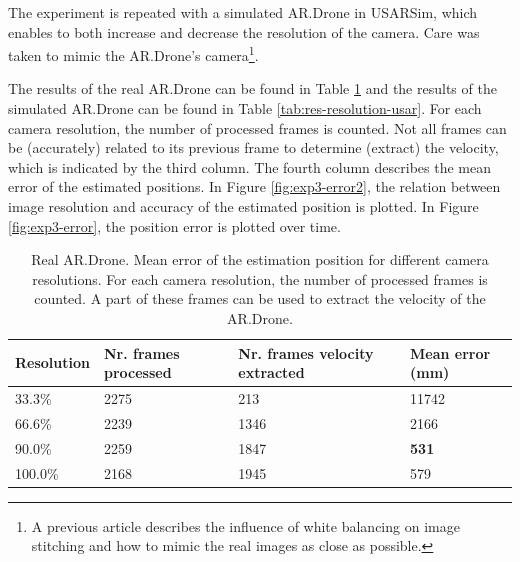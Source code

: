 The experiment is repeated with a simulated AR.Drone in USARSim, which enables to both increase and decrease the resolution of the camera.
Care was taken to mimic the AR.Drone's camera\footnote{A previous article \cite{Visser2011imav} describes the influence of white balancing on image stitching and how to mimic the real images as close as possible.}.

The results of the real AR.Drone can be found in Table \ref{tab:res-resolution-ar} and the results of the simulated AR.Drone can be found in Table \ref{tab:res-resolution-usar}.
For each camera resolution, the number of processed frames is counted.
Not all frames can be (accurately) related to its previous frame to determine (extract) the velocity, which is indicated by the third column.
The fourth column describes the mean error of the estimated positions.
In Figure \ref{fig:exp3-error2}, the relation between image resolution and accuracy of the estimated position is plotted.
In Figure \ref{fig:exp3-error}, the position error is plotted over time.


\begin{table}[htb!]
    \centering
    \begin{tabular}
        { | l | l | l | l | } 
	\hline
	Resolution & Nr. frames processed & Nr. frames velocity extracted & Mean error (mm) \\
        \hline
        33.3\% & 2275 & 213 & 11742 \\
	66.6\% & 2239 & 1346 & 2166 \\
	90.0\% & 2259 & 1847 & \textbf{531} \\
	100.0\% & 2168 & 1945 & 579 \\
	\hline
    \end{tabular}
    \caption{Real AR.Drone. Mean error of the estimation position for different camera resolutions. For each camera resolution, the number of processed frames is counted. A part of these frames can be used to extract the velocity of the AR.Drone.}
    \label{tab:res-resolution-ar}
\end{table}

